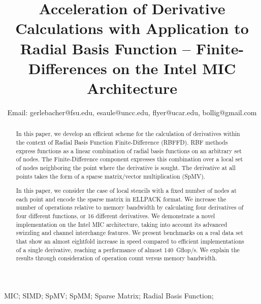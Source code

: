 \documentclass[10pt,conference,compsocconf]{IEEEtran}
\newcommand{\todo}[1]{{\color{red}\textbf{\hl{#1}}\xspace}}
\begin{document}
\title{Acceleration of Derivative Calculations with Application to Radial Basis Function --
Finite-Differences on the Intel MIC Architecture}


\author{
Email: gerlebacher@fsu.edu, esaule@uncc.edu, flyer@ucar.edu, bollig@gmail.com}
\maketitle


\begin{abstract}
In this paper, we develop an efficient scheme for the calculation of
derivatives within the context of Radial Basis Function
Finite-Difference (RBFFD). RBF methods express functions as a linear
combination of radial basis functions on an arbitrary set of
nodes. The Finite-Difference component expresses this combination over
a local set of nodes neighboring the point where the derivative is
sought.  The derivative at all points takes the form of a sparse
matrix/vector multiplication (SpMV).

In this paper, we consider the case of local stencils with a fixed number
of nodes at each point and encode the sparse matrix in ELLPACK
format. We increase the number of operations relative to memory
bandwidth by calculating four derivatives of four different functions,
or 16 different derivatives. We demonstrate a novel implementation on
the Intel MIC architecture, taking into account its advanced swizzling and
channel interchange features. We present benchmarks on a real data
set that show an almost eightfold increase in speed compared to
efficient implementations of a single derivative, reaching a
performance of almost 140~Gflop/s. We explain the results through
consideration of operation count versus memory bandwidth.
\end{abstract}

\begin{IEEEkeywords}
MIC; SIMD; SpMV; SpMM; Sparse Matrix; Radial Basis Function;
\end{IEEEkeywords}
\end{document}
